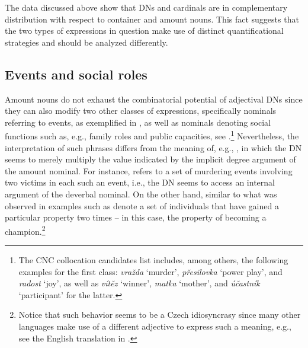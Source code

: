 \documentclass[output=paper,modfonts,hidelinks,newtxmath
\ChapterDOI{10.5281/zenodo.2545513}
]{langscibook}
\begin{document}
\ea {}
\z \z

\noindent The data discussed above show that DNs and cardinals are in complementary distribution with respect to container and amount nouns. This fact suggests that the two types of expressions in question make use of distinct quantificational strategies and should be analyzed differently.

\subsection{Events and social roles}\label{events-and-social-roles}

Amount nouns do not exhaust the combinatorial potential of adjectival DNs since they can also modify two other classes of expressions, specifically nominals referring to events, as exemplified in , as well as nominals denoting social functions such as, e.g., family roles and public capacities, see .\footnote{The CNC collocation candidates list includes, among others, the following examples for the first class: \textit{vražda} `murder', \textit{přesilovka} `power play', and \textit{radost} `joy', as well as \textit{vítěz} `winner', \textit{matka} `mother', and \textit{účastník} `participant' for the latter.} Nevertheless, the interpretation of such phrases differs from the meaning of, e.g., , in which the DN seems to merely multiply the value indicated by the implicit degree argument of the amount nominal. For instance,  refers to a set of murdering events involving two victims in each such an event, i.e., the DN seems to access an internal argument of the deverbal nominal. On the other hand, similar to what was observed in \citet{wagiel2015multiplicative} examples such as  denote a set of individuals that have gained a particular property two times -- in this case, the property of becoming a champion.\footnote{Notice that such behavior seems to be a Czech idiosyncrasy since many other languages make use of a different adjective to express such a meaning, e.g., see the English translation in .}
\end{document}
